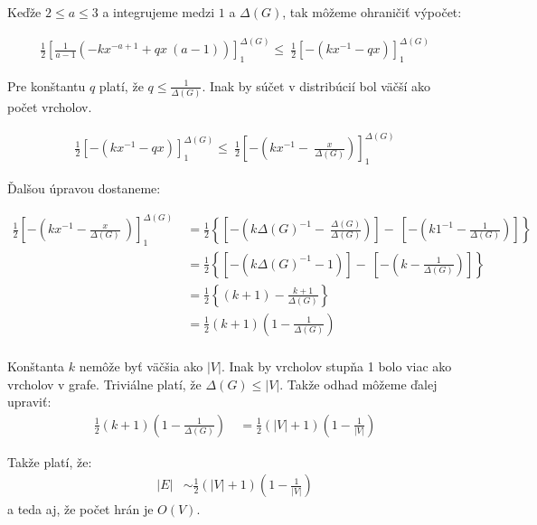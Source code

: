 Keďže $2 \leq a \leq 3$ a integrujeme medzi $1$ a $\Delta (G)$, tak môžeme 
ohraničiť výpočet:

\begin{align*}
\frac{1}{2}\left[\frac{1}{a - 1} \left(- k x^{- a + 1} + q x \
\left(a - 1\right)\right)\right]_1^{\Delta (G)} \leq \
\frac{1}{2}\left[- \left( k x^{- 1} - q x \right)\right]_1^{\Delta (G)}
\end{align*}

Pre konštantu $q$ platí, že $q \leq \frac{1}{\Delta (G)}$. Inak by súčet v 
distribúcií bol väčší ako počet vrcholov.

\begin{align*}
\frac{1}{2}\left[- \left( k x^{- 1} - q x \right)\right]_1^{\Delta (G)} \leq \
\frac{1}{2}\left[- \left( k x^{- 1} - \
\frac{x}{\Delta (G)} \right)\right]_1^{\Delta (G)} 
\end{align*}

Ďalšou úpravou dostaneme:

\begin{align*}
\frac{1}{2}\left[- \left( k x^{- 1} - \frac{x}{\Delta (G)} \
\right)\right]_1^{\Delta (G)} \
\!\!\!\!&= \frac{1}{2}\left\{\left[- \left( k \Delta (G)^{- 1} - \
\frac{\Delta (G)}{\Delta (G)}\right)\right] - \
\left[- \left( k 1^{- 1} - \frac{1}{\Delta (G)}\right)\right] \right\}\\
&= \frac{1}{2}\left\{\left[- \left( k \Delta (G)^{- 1} - 1 \right)\right] - \
\left[- \left( k - \frac{1}{\Delta (G)} \right)\right] \right\} \\
&= \frac{1}{2}\left\{\left(k + 1\right) - \frac{k+1}{\Delta (G)} \right\}\\
&= \frac{1}{2}\left(k + 1\right)\left( 1 - \frac{1}{\Delta (G)} \right)\\
\end{align*}

Konštanta $k$ nemôže byť väčšia ako $|V|$. Inak by vrcholov stupňa 1 bolo viac 
ako vrcholov v grafe. Triviálne platí, že $\Delta (G) \leq |V|$. Takže 
odhad môžeme ďalej upraviť:
\begin{align*}
\frac{1}{2}\left(k + 1\right)\left( 1 - \frac{1}{\Delta (G)} \right)\
&=\frac{1}{2}\left(|V| + 1\right)\left( 1 - \frac{1}{|V|} \right)
\end{align*}

Takže platí, že:
\begin{align*}
|E|&\sim \frac{1}{2}\left(|V| + 1\right)\left( 1 - \frac{1}{|V|} \right)
\end{align*}
a teda aj, že počet hrán je $O(V)$.

